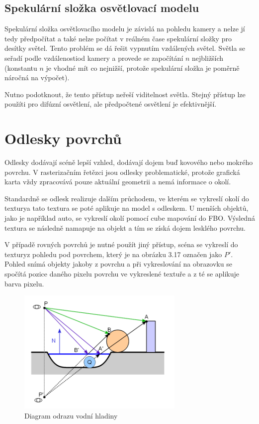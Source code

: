\documentclass[11pt,twoside,a4paper]{book}
\begin{document}
\subsection{Spekulární složka osvětlovací modelu}
Spekulární složka osvětlovacího modelu je závislá na pohledu kamery a nelze jí tedy předpočítat a také nelze počítat v reálném čase spekulární složky pro desítky světel. Tento problém se dá řešit vypnutím vzdálených světel. Světla se seřadí podle vzdálenosti\linebreak od kamery a provede se započítání $n$ nejbližších (konstantu $n$ je vhodné mít co nejnižší, protože spekulární složka je poměrně náročná na výpočet). 

Nutno podotknout, že tento přístup neřeší viditelnost světla. Stejný přístup lze použít\linebreak i pro difúzní osvětlení, ale předpočtené osvětlení je efektivnější.

\section{Odlesky povrchů}
Odlesky dodávají scéně lepší vzhled, dodávají dojem buď kovového nebo mokrého povrchu. V rasterizačním řetězci jsou odlesky problematické, protože grafická karta vždy zpracovává pouze aktuální geometrii a nemá informace o okolí.

Standardně se odlesk realizuje dalším průchodem, ve kterém se vykreslí okolí do textury\linebreak a tato textura se poté aplikuje na model s odleskem. U menších objektů, jako je například auto, se vykreslí okolí pomocí cube mapování do FBO. Výsledná textura se následně namapuje na objekt a tím se získá dojem lesklého povrchu.
\newpage

V případě rovných povrchů je nutné použít jiný přístup, scéna se vykreslí do textury\linebreak z pohledu pod povrchem, který je na obrázku 3.17 označen jako $P'$. Pohled snímá objekty jakoby z povrchu a při vykreslování na obrazovku se spočítá pozice daného pixelu povrchu ve vykreslené textuře a z té se aplikuje barva pixelu.

\begin{figure}[h!]
\begin{center}
\includegraphics[width=80mm]{figures/reflection-diagram.png}
\caption{Diagram odrazu vodní hladiny \cite{Kaplinski11}}
\end{center}
\end{figure}
\end{document}
